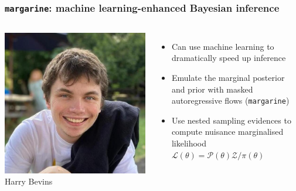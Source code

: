 \documentclass[aspectratio=169]{beamer}
\begin{document}
\begin{frame}
    \frametitle{\texttt{margarine}: machine learning-enhanced Bayesian inference}

    \begin{columns}
        \begin{columns}
            \includegraphics[width=\textwidth]{figures/harry_bevins.jpg}
            Harry Bevins \\  \\ 
            \begin{itemize}
                \item Can use machine learning to dramatically speed up inference
                \item Emulate the marginal posterior and prior with  masked autoregressive flows (\texttt{margarine})
                \item Use nested sampling evidences to compute nuisance marginalised likelihood $\mathcal{L}(\theta) = \mathcal{P}(\theta) \mathcal{Z}/\pi(\theta)$
            \end{itemize}
        \end{columns}
        \vspace{5pt}


\end{columns}
\end{frame}
\end{document}

